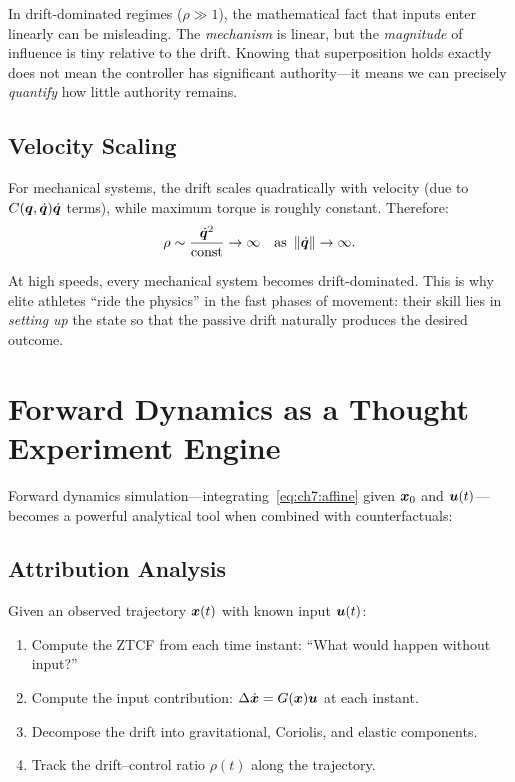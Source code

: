 \begin{warningbox}
In drift-dominated regimes ($\rho\gg 1$), the mathematical fact that inputs enter
linearly can be misleading. The \emph{mechanism} is linear, but the \emph{magnitude}
of influence is tiny relative to the drift. Knowing that superposition holds exactly
does not mean the controller has significant authority---it means we can precisely
\emph{quantify} how little authority remains.
\end{warningbox}

\subsection{Velocity Scaling}

For mechanical systems, the drift scales quadratically with velocity (due to
$C(\bm{q},\dot{\bm{q}})\dot{\bm{q}}$ terms), while maximum torque is roughly constant. Therefore:
\begin{equation}
\rho \sim \frac{\dot{\bm{q}}^2}{\text{const}} \to \infty
\quad\text{as } \left\lVert \dot{\bm{q}} \right\rVert\to\infty.
\label{eq:ch7:DCR-scaling}
\end{equation}

At high speeds, every mechanical system becomes drift-dominated. This is why elite
athletes ``ride the physics'' in the fast phases of movement: their skill lies in
\emph{setting up} the state so that the passive drift naturally produces the desired
outcome.

\section{Forward Dynamics as a Thought Experiment Engine}

Forward dynamics simulation---integrating~\eqref{eq:ch7:affine} given $\bm{x}_0$ and
$\bm{u}(t)$---becomes a powerful analytical tool when combined with counterfactuals:

\subsection{Attribution Analysis}

Given an observed trajectory $\bm{x}(t)$ with known input $\bm{u}(t)$:
\begin{enumerate}
\item Compute the ZTCF from each time instant: ``What would happen without input?''
\item Compute the input contribution: $\Delta\dot{\bm{x}} = G(\bm{x})\bm{u}$ at each instant.
\item Decompose the drift into gravitational, Coriolis, and elastic components.
\item Track the drift--control ratio $\rho(t)$ along the trajectory.
\end{enumerate}


